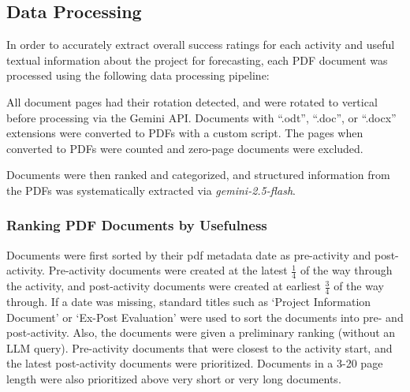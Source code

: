 \subsection{Data Processing}

In order to accurately extract overall success ratings for each activity and useful textual information about the project for forecasting, each PDF document was processed using the following data processing pipeline:

All document pages had their rotation detected, and were rotated to vertical before processing via the Gemini API. Documents with ``.odt'', ``.doc'', or ``.docx'' extensions were converted to PDFs with a custom script. The pages when converted to PDFs were counted and zero-page documents were excluded.

Documents were then ranked and categorized, and structured information from the PDFs was systematically extracted via \emph{gemini-2.5-flash}.

\subsubsection{Ranking PDF Documents by Usefulness}
Documents were first sorted by their pdf metadata date as pre-activity and post-activity. Pre-activity documents were created at the latest $\frac{1}{4}$ of the way through the activity, and post-activity documents were created at earliest $\frac{3}{4}$ of the way through. If a date was missing, standard titles such as `Project Information Document' or `Ex-Post Evaluation' were used to sort the documents into pre- and post-activity. Also, the documents were given a preliminary ranking (without an LLM query). Pre-activity documents that were closest to the activity start, and the latest post-activity documents were prioritized. Documents in a 3-20 page length were also prioritized above very short or very long documents.

